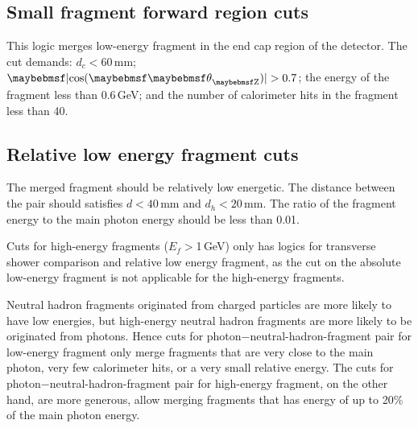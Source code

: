\subsection{Small fragment forward region cuts}

This logic merges low-energy fragment in the  end cap region of the detector. The cut demands: $d_c < 60$\,mm; $\absCosTheta > 0.7$; the energy of the fragment less than 0.6\,GeV; and the number of calorimeter hits in the fragment less than 40. 

\subsection{Relative low energy fragment cuts}

The merged fragment should be relatively low energetic. The distance between the pair should satisfies $d < 40$\,mm and $d_h < 20$\,mm. The ratio of the fragment energy  to the main photon energy should be less than 0.01.







Cuts for high-energy fragments ($E_f>$1\,GeV) only has logics for transverse shower comparison and relative low energy fragment, as the cut on the absolute low-energy fragment is not applicable for the  high-energy fragments.

Neutral hadron fragments originated from charged particles are more likely to have low energies, but high-energy neutral hadron fragments are more likely to be originated from photons. Hence cuts for photon$-$neutral-hadron-fragment pair for low-energy fragment only merge fragments that are very close to the main photon, very few calorimeter hits, or a very small relative energy. The cuts for photon$-$neutral-hadron-fragment pair for high-energy fragment, on the other hand, are more generous, allow merging fragments that has energy of up to 20\% of the main photon energy.


